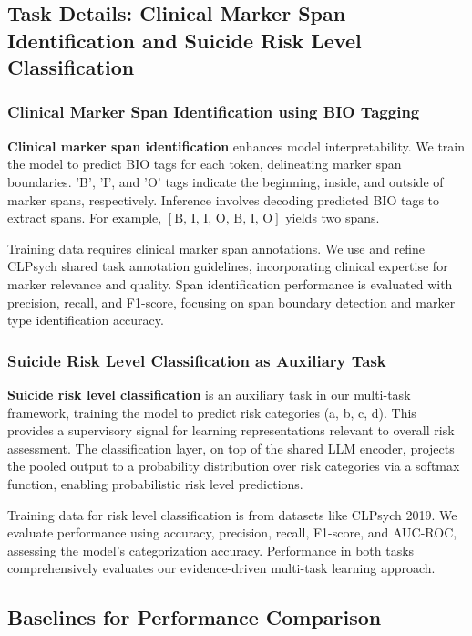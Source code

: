 \subsection{Task Details: Clinical Marker Span Identification and Suicide Risk Level Classification}

\subsubsection{Clinical Marker Span Identification using BIO Tagging}

\textbf{Clinical marker span identification} enhances model interpretability. We train the model to predict BIO tags for each token, delineating marker span boundaries. 'B', 'I', and 'O' tags indicate the beginning, inside, and outside of marker spans, respectively. Inference involves decoding predicted BIO tags to extract spans. For example, $[\text{B, I, I, O, B, I, O}]$ yields two spans.

Training data requires clinical marker span annotations. We use and refine CLPsych shared task annotation guidelines, incorporating clinical expertise for marker relevance and quality. Span identification performance is evaluated with precision, recall, and F1-score, focusing on span boundary detection and marker type identification accuracy.

\subsubsection{Suicide Risk Level Classification as Auxiliary Task}

\textbf{Suicide risk level classification} is an auxiliary task in our multi-task framework, training the model to predict risk categories (a, b, c, d). This provides a supervisory signal for learning representations relevant to overall risk assessment. The classification layer, on top of the shared LLM encoder, projects the pooled output to a probability distribution over risk categories via a softmax function, enabling probabilistic risk level predictions.

Training data for risk level classification is from datasets like CLPsych 2019. We evaluate performance using accuracy, precision, recall, F1-score, and AUC-ROC, assessing the model's categorization accuracy. Performance in both tasks comprehensively evaluates our evidence-driven multi-task learning approach.

\subsection{Baselines for Performance Comparison}

